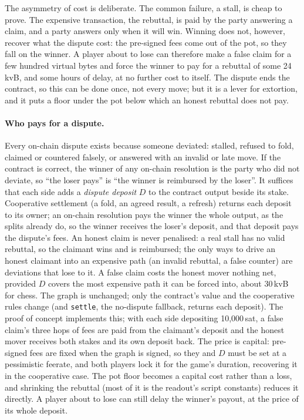 \documentclass[11pt]{article}
\begin{document}
The asymmetry of cost is deliberate. The common failure, a stall, is
cheap to prove. The expensive transaction, the rebuttal, is paid by
the party answering a claim, and a party answers only when it will win.
Winning does not, however, recover what the dispute cost: the
pre-signed fees come out of the pot, so they fall on the winner. A
player about to lose can therefore make a false claim for a few hundred
virtual bytes and force the winner to pay for a rebuttal of some
24\,kvB, and some hours of delay, at no further cost to itself. The
dispute ends the contract, so this can be done once, not every move; but
it is a lever for extortion, and it puts a floor under the pot below
which an honest rebuttal does not pay.

\paragraph{Who pays for a dispute.}
Every on-chain dispute exists because someone deviated: stalled,
refused to fold, claimed or countered falsely, or answered with an
invalid or late move. If the contract is correct, the winner of any
on-chain resolution is the party who did not deviate, so ``the loser
pays'' is ``the winner is reimbursed by the loser''. It suffices that
each side adds a \emph{dispute deposit} $D$ to the contract output
beside its stake. Cooperative settlement (a fold, an agreed result, a
refresh) returns each deposit to its owner; an on-chain resolution pays
the winner the whole output, as the splits already do, so the winner
receives the loser's deposit, and that deposit pays the dispute's fees.
An honest claim is never penalised: a real stall has no valid
rebuttal, so the claimant wins and is reimbursed; the only ways to
drive an honest claimant into an expensive path (an invalid rebuttal,
a false counter) are deviations that lose to it. A false claim costs the
honest mover nothing net, provided $D$ covers the most expensive path
it can be forced into, about 30\,kvB for chess. The graph is unchanged;
only the contract's value and the cooperative rules change (and
\texttt{settle}, the no-dispute fallback, returns each deposit). The
proof of concept implements this; with each side depositing 10,000\,sat,
a false claim's three hops of fees are paid from the claimant's deposit
and the honest mover receives both stakes and its own deposit back. The price is
capital: pre-signed fees are fixed when the graph is signed, so they
and $D$ must be set at a pessimistic feerate, and both players lock it for the game's
duration, recovering it in the cooperative case. The pot floor becomes a
capital cost rather than a loss, and shrinking the rebuttal (most of
it is the readout's script constants) reduces it directly. A player
about to lose can still delay the winner's payout, at the price of its
whole deposit.
\end{document}
